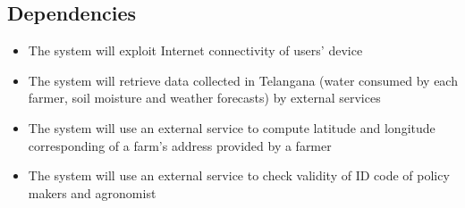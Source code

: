 \subsection{Dependencies}

\begin{itemize}
    \item The system will exploit Internet connectivity of users' device
    \item The system will retrieve data collected in Telangana (water consumed by each farmer, soil moisture and weather forecasts) by external services
    \item The system will use an external service to compute latitude and longitude corresponding of a farm's address provided by a farmer
    \item The system will use an external service to check validity of ID code of policy makers and agronomist
\end{itemize}
